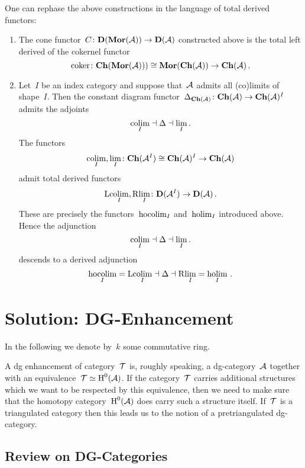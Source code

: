 \documentclass[a4paper,10pt]{scrartcl}
\begin{document}
One can rephase the above constructions in the language of total derived functors:
\begin{enumerate}
  \item
    The cone functor~$C \colon \mathbf{D}(\mathbf{Mor}(\mathcal{A})) \to \mathbf{D}(\mathcal{A})$ constructed above is the total left derived of the cokernel functor
    \[
      \operatorname{coker}
      \colon
      \mathbf{Ch}(\mathbf{Mor}(\mathcal{A})))
      \cong
      \mathbf{Mor}(\mathbf{Ch}(\mathcal{A}))
      \to
      \mathbf{Ch}(\mathcal{A}) \,.
    \]
  \item
    Let~$I$ be an index category and suppose that~$\mathcal{A}$ admits all (co)limits of shape~$I$.
    Then the constant diagram functor~$\Delta_{\mathbf{Ch}(\mathcal{A})} \colon \mathbf{Ch}(\mathcal{A}) \to \mathbf{Ch}(\mathcal{A})^I$ admits the adjoints
    \[
      {\operatorname*{colim}_I}
      \mathrel{\dashv}
      \Delta
      \mathrel{\dashv}
      {\lim_I} \,.
    \]
    The functors
    \[
      \operatorname*{colim}_I, \lim_I
      \colon
      \mathbf{Ch}(\mathcal{A}^I)
      \cong
      \mathbf{Ch}(\mathcal{A})^I
      \to
      \mathbf{Ch}(\mathcal{A})
    \]
    admit total derived functors
    \[
      \mathrm{L} {\operatorname*{colim}_I},
      \mathrm{R} {\lim_I}
      \colon
      \mathbf{D}(\mathcal{A}^I)
      \to
      \mathbf{D}(\mathcal{A}) \,.
    \]
    These are precisely the functors~$\operatorname*{hocolim}_I$ and~$\operatorname*{holim}_I$ introduced above.
    Hence the adjunction
    \[
      {\operatorname*{colim}_I}
      \mathrel{\dashv}
      \Delta
      \mathrel{\dashv}
      {\lim_I} \,.
    \]
    descends to a derived adjunction
    \[
      \operatorname*{hocolim}_I
      =
      \mathrm{L} {\operatorname*{colim}_I}
      \mathrel{\dashv}
      \Delta
      \mathrel{\dashv}
      \mathrm{R} {\lim_I}
      =
      \operatorname*{holim}_I \,.
    \]
\end{enumerate}





\section{Solution: DG-Enhancement}

In the following we denote by~$k$ some commutative ring.

A dg enhancement of category~$\mathcal{T}$ is, roughly speaking, a dg-category~$\mathcal{A}$ together with an equivalence~$\mathcal{T} \simeq \operatorname{H}^0(\mathcal{A})$.
If the category~$\mathcal{T}$ carries additional structures which we want to be respected by this equivalence, then we need to make sure that the homotopy category~$\operatorname{H}^0(\mathcal{A})$ does carry such a structure itself.
If~$\mathcal{T}$ is a triangulated category then this leads us to the notion of a pretriangulated dg-category.



\subsection{Review on DG-Categories}
\end{document}
